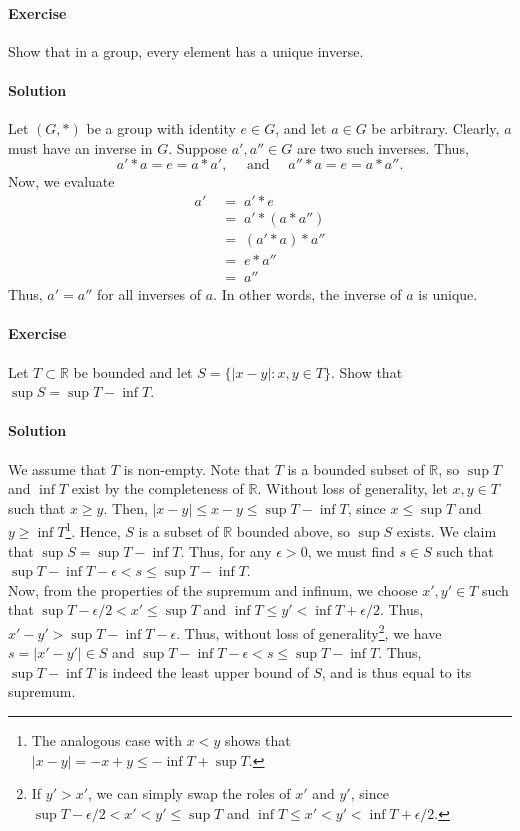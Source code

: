 \documentclass[10pt]{article}
\newcounter{prob}
\def\problem{\stepcounter{prob}\paragraph{Exercise \arabic{prob}}}
\def\solution{\paragraph{Solution}}
\begin{document}
        \problem Show that in a group, every element has a unique inverse.
        \solution Let $(G, *)$ be a group with identity $e \in G$, and let $a \in G$ be arbitrary. Clearly, $a$ must have an inverse
        in $G$. Suppose $a', a'' \in G$ are two such inverses. Thus,
        \[
                a' * a = e = a * a', \quad\text{ and }\quad a'' * a = e = a * a''.
        \]
        Now, we evaluate
        \begin{align*}
                a' \;&=\; a' * e \tag{Identity} \\
                        \;&=\; a' * (a * a'') \tag{Composition with inverse} \\
                        \;&=\; (a' * a) * a'' \tag{Associativity} \\
                        \;&=\; e * a''          \tag{Composition with inverse} \\
                        \;&=\; a''      \tag{Identity}
        \end{align*}
        Thus, $a' = a''$ for all inverses of $a$. In other words, the inverse of $a$ is unique.

        \problem Let $T \subset \mathbb{R}$ be bounded and let $S = \{|x - y| : x, y \in T\}$. Show that $\sup S = \sup T - \inf T$.
        \solution We assume that $T$ is non-empty.
        Note that $T$ is a bounded subset of $\mathbb{R}$, so $\sup T$ and $\inf T$ exist by the completeness of $\mathbb{R}$.
        Without loss of generality, let $x, y \in T$ such that $x \geq y$. Then, $|x - y| \leq x - y \leq \sup T - \inf T$,
        since $x \leq \sup T$ and $y \geq \inf T$\footnote{The analogous case with $x < y$ shows that $|x - y| = -x + y \leq -\inf T + \sup T$.}.
        Hence, $S$ is a subset of $\mathbb{R}$ bounded above, so $\sup S$ exists. We claim that $\sup S = \sup T - \inf T$.
        Thus, for any $\epsilon > 0$, we must find $s \in S$ such that $\sup T - \inf T - \epsilon < s \leq \sup T - \inf T$. \\
        Now, from the properties of the supremum and infinum, we choose $x', y' \in T$ such that $\sup T - \epsilon /2 < x' \leq \sup T$
        and $\inf T \leq y' < \inf T + \epsilon /2$. Thus, $x' - y' > \sup T - \inf T - \epsilon$. Thus,
        without loss of generality\footnote{If $y' > x'$, we can simply swap the roles of $x'$ and $y'$, since
        $\sup T - \epsilon /2 < x' < y' \leq \sup T$ and $\inf T \leq x' < y' < \inf T + \epsilon /2$.}, we have $ s = |x' - y'| \in S$
        and $\sup T - \inf T - \epsilon < s \leq \sup T - \inf T$. Thus, $\sup T - \inf T$ is indeed the least upper bound of $S$,
        and is thus equal to its supremum.
\end{document}
